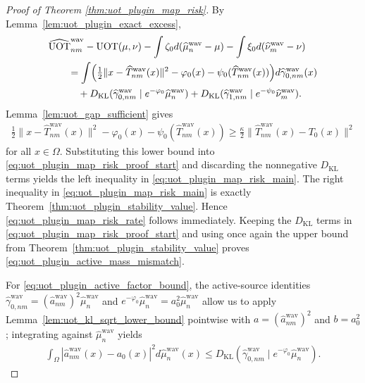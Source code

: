 \documentclass[11pt,reqno]{amsart}
\theoremstyle{definition}
\newcommand{\KL}{\mathrm{KL}}
\renewcommand{\hat}{\widehat}
\begin{document}
\begin{proof}[Proof of Theorem \ref{thm:uot_plugin_map_risk}]
By Lemma~\ref{lem:uot_plugin_exact_excess},
\begin{align}
\label{eq:uot_plugin_map_risk_proof_start}
\begin{aligned}
&\widehat{\mathrm{UOT}}_{nm}^{\mathrm{wav}}
- \mathrm{UOT}(\mu,\nu)
- \int \zeta_0 d(\hat\mu_n^{\mathrm{wav}}-\mu)
- \int \xi_0 d(\hat\nu_m^{\mathrm{wav}}-\nu) \\
&\qquad=
\int
\Bigl(
\tfrac{1}{2}\|x-\hat T_{nm}^{\mathrm{wav}}(x)\|^2
- \varphi_0(x)-\psi_0(\hat T_{nm}^{\mathrm{wav}}(x))
\Bigr)
  d\hat\gamma_{0,nm}^{\mathrm{wav}}(x) \\
&\qquad\quad + {D_\KL}(\hat\gamma_{0,nm}^{\mathrm{wav}}\mid e^{-\varphi_0}\hat\mu_n^{\mathrm{wav}})
+ {D_\KL}(\hat\gamma_{1,nm}^{\mathrm{wav}}\mid e^{-\psi_0}\hat\nu_m^{\mathrm{wav}}).
\end{aligned}
\end{align}
Lemma~\ref{lem:uot_gap_sufficient} gives
\begin{align*}
    \tfrac{1}{2}\|x-\hat T_{nm}^{\mathrm{wav}}(x)\|^2
    - \varphi_0(x)-\psi_0(\hat T_{nm}^{\mathrm{wav}}(x))
    \ge \frac{\kappa}{2}\|\hat T_{nm}^{\mathrm{wav}}(x)-T_0(x)\|^2
\end{align*}
for all $x\in\Omega$.
Substituting this lower bound into \eqref{eq:uot_plugin_map_risk_proof_start} and discarding the {nonnegative $D_\KL$ terms} yields the left inequality in \eqref{eq:uot_plugin_map_risk_main}. The right inequality in \eqref{eq:uot_plugin_map_risk_main} is exactly Theorem~\ref{thm:uot_plugin_stability_value}. Hence \eqref{eq:uot_plugin_map_risk_rate} follows immediately.
Keeping the {$D_\KL$ terms} in \eqref{eq:uot_plugin_map_risk_proof_start} and using once again the upper bound from Theorem~\ref{thm:uot_plugin_stability_value} proves \eqref{eq:uot_plugin_active_mass_mismatch}.

For \eqref{eq:uot_plugin_active_factor_bound}, the active-source identities $\hat\gamma_{0,nm}^{\mathrm{wav}}=(\hat a_{nm}^{\mathrm{wav}})^2\hat\mu_n^{\mathrm{wav}}$ and $e^{-\varphi_0}\hat\mu_n^{\mathrm{wav}}=a_0^2\hat\mu_n^{\mathrm{wav}}$ allow us to apply Lemma~\ref{lem:uot_kl_sqrt_lower_bound} pointwise with $a=(\hat a_{nm}^{\mathrm{wav}})^2$ and $b=a_0^2$; integrating against $\hat\mu_n^{\mathrm{wav}}$ yields
\begin{align*}
    \int_{\Omega}|\hat a_{nm}^{\mathrm{wav}}(x)-a_0(x)|^2 d\hat\mu_n^{\mathrm{wav}}(x)
    \le {D_\KL}(\hat\gamma_{0,nm}^{\mathrm{wav}}\mid e^{-\varphi_0}\hat\mu_n^{\mathrm{wav}}).
\end{align*}


\end{proof}
\end{document}
